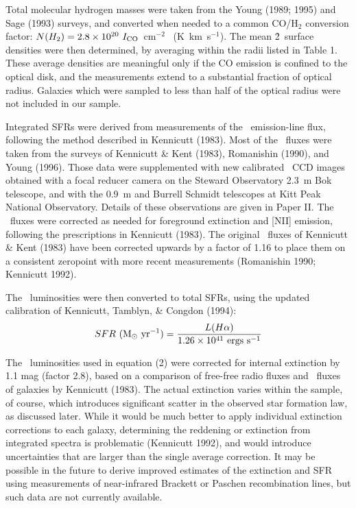 Total molecular hydrogen masses were taken from the Young \etal 
(1989; 1995) and Sage (1993) surveys, and converted when needed to
a common CO/H$_2$ 
conversion factor:  $N(H_2) = 2.8 \times 10^{20}~I_{{\rm CO}}$~cm$^{-2}$~ 
(K~km~s$^{-1}$). 
The mean \h2\ surface densities were then determined, by averaging within the 
radii listed in Table 1.  These average densities are meaningful only if 
the CO emission is confined to the optical disk, and the measurements extend  
to a substantial fraction of optical radius.  Galaxies  
which were sampled to less than half of the optical radius were not  
included in our sample.

Integrated SFRs were derived from measurements of the \halpha\ 
emission-line flux, following the method described in Kennicutt (1983).  
Most of the \halpha\ fluxes were taken from the surveys of Kennicutt \& 
Kent (1983), Romanishin 
(1990), and Young \etal (1996).  Those data were supplemented with new 
calibrated \halpha\ CCD images obtained with a focal reducer camera on the 
Steward Observatory 2.3~m Bok telescope, and with the 0.9~m and Burrell Schmidt 
telescopes at Kitt Peak National Observatory.  Details of these 
observations are given in Paper II.  The \halpha\ 
fluxes were corrected as needed for foreground extinction and [NII] 
emission, following the prescriptions in Kennicutt (1983).  The  
original \halpha\ fluxes of Kennicutt \& Kent (1983) have been corrected
upwards by a factor of 1.16 to place them on a consistent zeropoint with
more recent measurements (Romanishin 1990; Kennicutt 1992).  

The \halpha\ luminosities were then converted to total SFRs,  
using the updated calibration 
of Kennicutt, Tamblyn, \& Congdon (1994): 
\begin{equation} 
SFR~({\rm M_\odot~yr^{-1}}) = {{L(H\alpha)} \over {1.26 \times 10^{41} 
~{\rm ergs~s^{-1}}}} 
\end{equation}

\noindent 
The \halpha\ luminosities used in equation (2) were corrected 
for internal extinction by 1.1 mag (factor 2.8), based on a 
comparison of free-free radio fluxes and \halpha\ fluxes of 
galaxies by Kennicutt (1983).   
The actual extinction varies within the sample, of course, 
which introduces significant scatter in the observed star 
formation law, as discussed later.  While it would be much
better to apply individual extinction corrections to each galaxy,
determining the reddening or extinction from integrated spectra
is problematic (Kennicutt 1992), and would introduce uncertainties
that are larger than the single average correction.  It may be
possible in the future to derive improved estimates of the extinction
and SFR using measurements of near-infrared Brackett or Paschen
recombination lines, but such data are not currently available.

